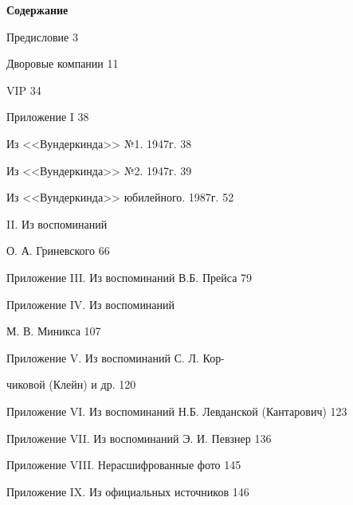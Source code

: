 \documentclass[utf8x, 12pt, twoside, a5paper]{G7-32} %
\begin{document}
\begin{center}

    \textbf{\Large Содержание}

    \indent

    Предисловие \hfill 3
    
    Дворовые компании \hfill 11
    
    VIP \hfill 34
    
    Приложение I \hfill 38
    
    \hspace{20pt} Из <<Вундеркинда>> №1. 1947г. \hfill 38
    
    \hspace{20pt} Из <<Вундеркинда>> №2. 1947г. \hfill 39
    
    \hspace{20pt} Из <<Вундеркинда>> юбилейного. 1987г. \hfill 52
    
    
    { II. Из воспоминаний 
    
    }
    
    \hspace{93pt}О. А. Гриневского \hfill 66
    
    Приложение III. Из воспоминаний В.Б. Прейса \hfill 79

    {\raggedright Приложение IV. Из воспоминаний
    
    } 
    \hspace{93pt}М. В. Миникса \hfill 107
   
    {\raggedright Приложение V. Из воспоминаний С. Л. Кор-
    
    }
    
    \hspace{93pt}чиковой (Клейн) и др. \hfill 120
    
    Приложение VI. Из воспоминаний Н.Б. Левданской (Кантарович) \hfill 123

    Приложение VII. Из воспоминаний Э. И. Певзнер \hfill 136
    
    Приложение VIII. Нерасшифрованные фото \hfill 145    
    
    Приложение IX. Из официальных источников \hfill 146
    
    
    
\end{center}
\end{document}
